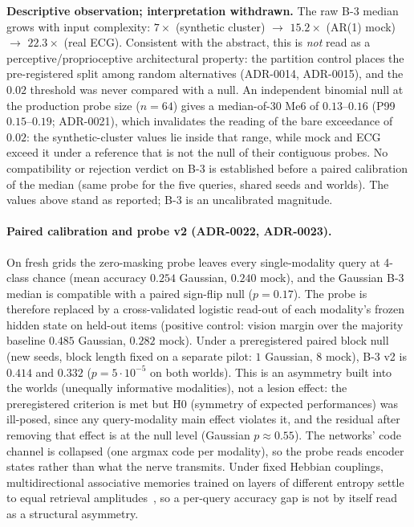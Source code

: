 \documentclass{article}
\begin{document}
\textbf{Descriptive observation; interpretation withdrawn.} The
raw B-3 median grows with input complexity: $7\times$ (synthetic
cluster) $\to$ $15.2\times$ (AR(1) mock) $\to$ $22.3\times$ (real
ECG). Consistent with the abstract, this is \emph{not} read as a
perceptive/proprioceptive architectural property: the partition
control places the pre-registered split among random alternatives
(ADR-0014, ADR-0015), and the $0.02$ threshold was never compared
with a null. An independent binomial null at the production probe
size ($n = 64$) gives a median-of-30 Me6 of $0.13$--$0.16$ (P99
$0.15$--$0.19$; ADR-0021), which invalidates the reading of the
bare exceedance of $0.02$: the synthetic-cluster values lie inside
that range, while mock and ECG exceed it under a reference that is
not the null of their contiguous probes. No compatibility or
rejection verdict on B-3 is established before a paired calibration
of the median (same probe for the five queries, shared seeds and
worlds). The values above stand as reported; B-3 is an uncalibrated
magnitude.

\paragraph{Paired calibration and probe v2 (ADR-0022, ADR-0023).}
On fresh grids the zero-masking probe leaves every single-modality
query at 4-class chance (mean accuracy $0.254$ Gaussian, $0.240$
mock), and the Gaussian B-3 median is compatible with a paired
sign-flip null ($p = 0.17$). The probe is therefore replaced by a
cross-validated logistic read-out of each modality's frozen hidden
state on held-out items (positive control: vision margin over the
majority baseline $0.485$ Gaussian, $0.282$ mock). Under a
preregistered paired block null (new seeds, block length fixed on a
separate pilot: $1$ Gaussian, $8$ mock), B-3 v2 is $0.414$ and
$0.332$ ($p = 5\cdot10^{-5}$ on both worlds). This is an asymmetry
built into the worlds (unequally informative modalities), not a
lesion effect: the preregistered criterion is met but H0 (symmetry of
expected performances) was ill-posed, since any query-modality main
effect violates it, and the residual after removing that effect is at
the null level (Gaussian $p \approx 0.55$). The networks' code
channel is collapsed (one argmax code per modality), so the probe
reads encoder states rather than what the nerve transmits. Under fixed Hebbian couplings, multidirectional
associative memories trained on layers of different entropy settle
to equal retrieval amplitudes~\citep{alessandrelli2025cooperativeness},
so a per-query accuracy gap is not by itself read as a structural
asymmetry.
\end{document}
